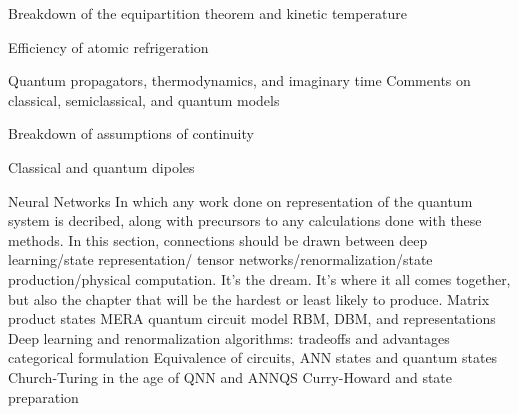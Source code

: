 { Breakdown of the equipartition theorem and kinetic temperature
{ Efficiency of atomic refrigeration
{ Quantum propagators, thermodynamics, and imaginary time
 Comments on classical, semiclassical, and quantum models
{ Breakdown of assumptions of continuity
{ Classical and quantum dipoles
{
Neural Networks In which any work done on representation of the quantum system is
decribed, along with precursors to any calculations done with these methods.
	In
this section, connections should be drawn between deep learning/state representation/
tensor networks/renormalization/state production/physical computation.
	It's
the dream.
	It's where it all comes together, but also the chapter that will be the
hardest or least likely to produce.
 Matrix product states
 MERA
 quantum circuit model
 RBM, DBM, and representations
 Deep learning and renormalization
 algorithms: tradeoffs and advantages
 categorical formulation
 Equivalence of circuits, ANN states and quantum states
 Church-Turing in the age of QNN and ANNQS
 Curry-Howard and state preparation

}}}}}}
